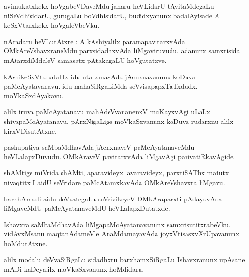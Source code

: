 \documentclass{article}
\begin{document}
\begin{mn}
avimukatxkekx hoVgabeVDaveMdu janaru heVLidarU tAyitaMdegaLu niSeVdhisidarU, gurugaLu boVdhisidarU,
budidxyanunx badalAyisade A keSxVtarxkekx hoVgaleVbeVku.
\end{mn}


\begin{mn}
nAradaru heVLutAtxre : A kAshiyalilx paramapavitarxvAda OMkAreVshavxraneMdu parxsidadhxvAda 
liMgaviruvudu. adanunx samxrisida mAtarxdiMdaleV samasatx pAtakagaLU hoVgutatxve.
\end{mn}

\begin{mn}
kAshikeSxVtarxdalilx idu utatxmavAda jAcnxnavanunx koDuva paMcAyatavanavu. idu mahaSiRgaLiMda 
seVvisapapxTaTxdudx. moVkaSxdAyakavu.
\end{mn}

\begin{mn}
alilx iruva paMcAyatanavu mahAdeVvananenxV muKayxvAgi uLaLx shivapaMcAyatanavu. pArxNigaLige 
moVkaSxvanunx koDuva rudarxnu alilx kirxVDisutAtxne.
\end{mn}

\begin{mn}
pashupatiya saMbaMdhavAda jAcnxnaveV paMcAyatanaveMdu heVLalapxDuvudu. OMkAraveV pavitarxvAda 
liMgavAgi parivatiRkavAgide.
\end{mn}

\begin{mn}
shAMtige miVrida shAMti, aparavideyx, avaravideyx, parxtiSAThx matutx nivaqtitx I aidU seVridare 
paMcAtamxkavAda OMkAreVshavxra liMgavu.
\end{mn}

\begin{mn}
barxhAmxdi aidu deVvategaLa seVrivikeyeV OMkAraparxti pAdayxvAda liMgaveMdU paMcAyatanaveMdU 
heVLalapxDutatxde.
\end{mn}

\begin{mn}
Ishavxra saMbaMdhavAda liMgapaMcAyatanavanunx samxrisutitxrabeVku. vidAvxMsanu maqtanAdameVle 
AnaMdamayavAda joyxVtisasxvXrUpavanunx hoMdutAtxne.
\end{mn}

\begin{mn}
alilx modalu deVvaSiRgaLu sidadhxru barxhamxSiRgaLu Ishavxranunx upAsane mADi kaDeyalilx 
moVkaSxvanunx hoMdidaru.
\end{mn}
\end{document}
